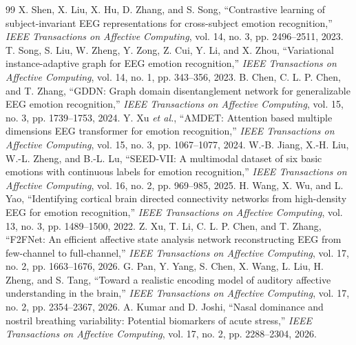 \documentclass[journal]{IEEEtran}
\begin{document}
\begin{thebibliography}{99}
 X. Shen, X. Liu, X. Hu, D. Zhang, and S. Song, ``Contrastive learning of subject-invariant EEG representations for cross-subject emotion recognition,'' \emph{IEEE Transactions on Affective Computing}, vol. 14, no. 3, pp. 2496--2511, 2023.
 T. Song, S. Liu, W. Zheng, Y. Zong, Z. Cui, Y. Li, and X. Zhou, ``Variational instance-adaptive graph for EEG emotion recognition,'' \emph{IEEE Transactions on Affective Computing}, vol. 14, no. 1, pp. 343--356, 2023.
 B. Chen, C. L. P. Chen, and T. Zhang, ``GDDN: Graph domain disentanglement network for generalizable EEG emotion recognition,'' \emph{IEEE Transactions on Affective Computing}, vol. 15, no. 3, pp. 1739--1753, 2024.
 Y. Xu \emph{et al.}, ``AMDET: Attention based multiple dimensions EEG transformer for emotion recognition,'' \emph{IEEE Transactions on Affective Computing}, vol. 15, no. 3, pp. 1067--1077, 2024.
 W.-B. Jiang, X.-H. Liu, W.-L. Zheng, and B.-L. Lu, ``SEED-VII: A multimodal dataset of six basic emotions with continuous labels for emotion recognition,'' \emph{IEEE Transactions on Affective Computing}, vol. 16, no. 2, pp. 969--985, 2025.
 H. Wang, X. Wu, and L. Yao, ``Identifying cortical brain directed connectivity networks from high-density EEG for emotion recognition,'' \emph{IEEE Transactions on Affective Computing}, vol. 13, no. 3, pp. 1489--1500, 2022.
 Z. Xu, T. Li, C. L. P. Chen, and T. Zhang, ``F2FNet: An efficient affective state analysis network reconstructing EEG from few-channel to full-channel,'' \emph{IEEE Transactions on Affective Computing}, vol. 17, no. 2, pp. 1663--1676, 2026.
 G. Pan, Y. Yang, S. Chen, X. Wang, L. Liu, H. Zheng, and S. Tang, ``Toward a realistic encoding model of auditory affective understanding in the brain,'' \emph{IEEE Transactions on Affective Computing}, vol. 17, no. 2, pp. 2354--2367, 2026.
 A. Kumar and D. Joshi, ``Nasal dominance and nostril breathing variability: Potential biomarkers of acute stress,'' \emph{IEEE Transactions on Affective Computing}, vol. 17, no. 2, pp. 2288--2304, 2026.
\end{thebibliography}
\end{document}
